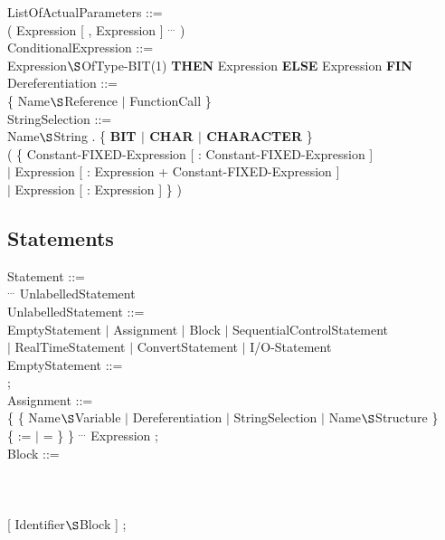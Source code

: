 ListOfActualParameters ::= \\
\x ( Expression [ , Expression ] $^{...}$ )\\

ConditionalExpression ::=\\
 Expression$\S $OfType-BIT(1) {\bf THEN} Expression {\bf ELSE} Expression {\bf FIN}\\

Dereferentiation ::=\\
 \{ Name$\S $Reference $\mid$ FunctionCall \}\\

StringSelection ::=\\
\x Name$\S $String . \{ {\bf BIT $\mid$ CHAR $\mid$ CHARACTER} \}\\ 
\x ( \{ Constant-FIXED-Expression [ : Constant-FIXED-Expression ]\\
\x \x $\mid$ Expression [ : Expression + Constant-FIXED-Expression ]\\
\x \x $\mid$ Expression [ : Expression ] \} )\\

\subsection{Statements}    %

Statement ::=\\
 $^{...}$ UnlabelledStatement\\

UnlabelledStatement ::=\\
\x EmptyStatement $\mid$ Assignment $\mid$ Block $\mid$ SequentialControlStatement\\
\x $\mid$ RealTimeStatement $\mid$ ConvertStatement $\mid$ I/O-Statement\\

EmptyStatement ::=\\
\x ;\\

Assignment ::=\\
\x \{ \{ Name$\S $Variable $\mid$ Dereferentiation $\mid$ StringSelection $\mid$ 
Name$\S $Structure \}\\   
\x \{ := $\mid$ = \} \} $^{...}$ Expression ;\\

Block ::= \\
\\
\x {}\\ 
\x \x [ Statement $^{...}$ ] \\
 [ Identifier$\S $Block ] ;\\

